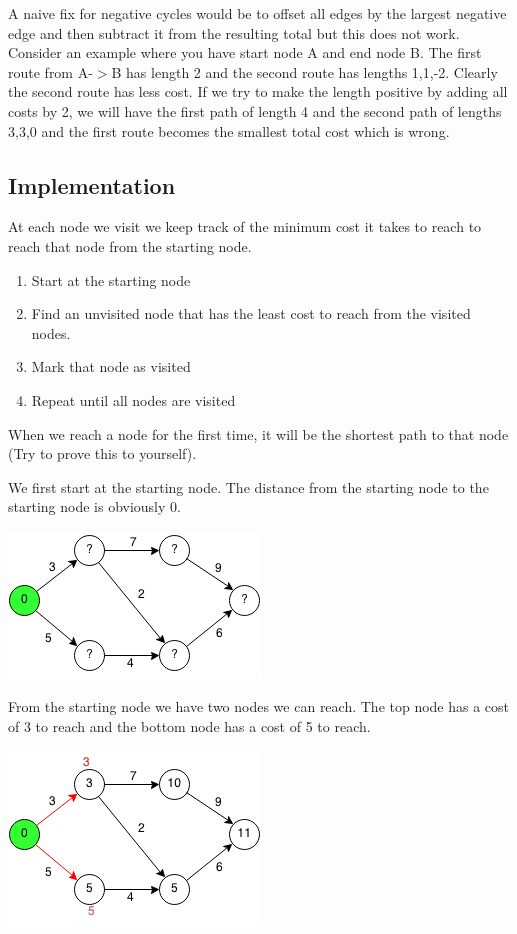 \documentclass[11pt,oneside]{book}
\makeatletter
\def\maxwidth#1{\ifdim\Gin@nat@width>#1 #1\else\Gin@nat@width\fi}
\makeatother
\begin{document}
A naive fix for negative cycles would be to offset all edges by the largest negative edge and then subtract it from the resulting total but this does not work. Consider an example where you have start node A and end node B. The first route from A-$>$B has length 2 and the second route has lengths 1,1,-2. Clearly the second route has less cost. If we try to make the length positive by adding all costs by 2, we will have the first path of length 4 and the second path of lengths 3,3,0 and the first route becomes the smallest total cost which is wrong.

\subsection{Implementation}

At each node we visit we keep track of the minimum cost it takes to reach to reach that node from the starting node.

\begin{enumerate}
\item Start at the starting node
\item Find an unvisited node that has the least cost to reach from the visited nodes.
\item Mark that node as visited
\item Repeat until all nodes are visited
\end{enumerate}

When we reach a node for the first time, it will be the shortest path to that node (Try to prove this to yourself).

We first start at the starting node. The distance from the starting node to the starting node is obviously 0.

\includegraphics[width=\maxwidth{\textwidth}]{djikstra.png}

From the starting node we have two nodes we can reach. The top node has a cost of 3 to reach and the bottom node has a cost of 5 to reach.

\includegraphics[width=\maxwidth{\textwidth}]{djikstra1.png}
\end{document}
